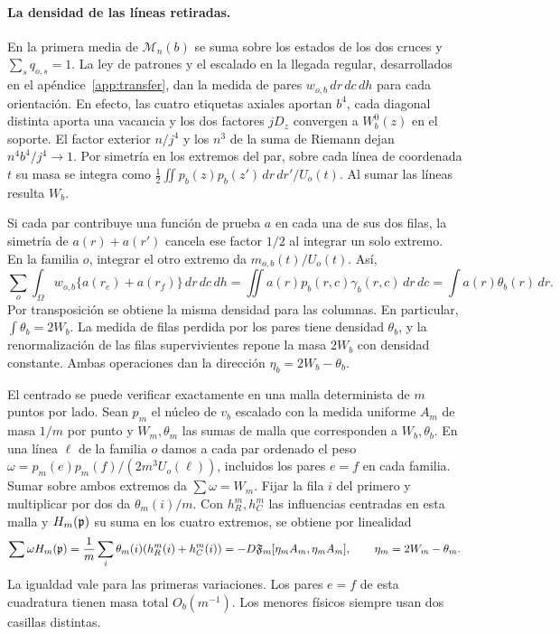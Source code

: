 \paragraph{La densidad de las líneas retiradas.}
En la primera media de \(\mathcal M_n(b)\) se suma sobre los estados de los dos cruces y
\(\sum_s q_{o,s}=1\). La ley de patrones y el escalado en la llegada regular, desarrollados
en el apéndice~\ref{app:transfer}, dan la medida de pares
\(w_{o,b}\,dr\,dc\,dh\) para cada orientación. En efecto, las cuatro etiquetas axiales
aportan \(b^4\), cada diagonal distinta aporta una vacancia y los dos factores \(jD_z\)
convergen a \(W_b^0(z)\) en el soporte. El factor exterior \(n/j^4\) y los \(n^3\) de la
suma de Riemann dejan \(n^4 b^4/j^4\to1\). Por simetría en los extremos del par, sobre
cada línea de coordenada \(t\) su masa se integra como
\(\frac12\iint p_b(z)p_b(z')\,dr\,dr'/U_o(t)\). Al sumar las líneas resulta \(W_b\).

Si cada par contribuye una función de prueba \(a\) en cada una de sus dos filas,
la simetría de \(a(r)+a(r')\) cancela ese factor \(1/2\) al integrar un solo extremo.
En la familia \(o\), integrar el otro extremo da \(m_{o,b}(t)/U_o(t)\). Así,
\[
 \sum_o\int_\Omega w_{o,b}\{a(r_e)+a(r_f)\}\,dr\,dc\,dh
 =\iint a(r)p_b(r,c)\gamma_b(r,c)\,dr\,dc
 =\int a(r)\theta_b(r)\,dr .
\]
Por transposición se obtiene la misma densidad para las columnas. En particular,
\(\int\theta_b=2W_b\). La medida de filas perdida por los pares tiene densidad
\(\theta_b\), y la renormalización de las filas supervivientes repone la masa \(2W_b\)
con densidad constante. Ambas operaciones dan la dirección \(\eta_b=2W_b-\theta_b\).

El centrado se puede verificar exactamente en una malla determinista de \(m\) puntos por
lado. Sean \(p_m\) el núcleo de \(v_b\) escalado con la medida uniforme \(A_m\) de masa
\(1/m\) por punto y \(W_m,\theta_m\) las sumas de malla que corresponden a \(W_b,\theta_b\).
En una línea \(\ell\) de la familia \(o\) damos a cada par ordenado el peso
\(\omega=p_m(e)p_m(f)/(2m^3 U_o(\ell))\), incluidos los pares \(e=f\) en cada familia.
Sumar sobre ambos extremos da \(\sum\omega=W_m\). Fijar la fila \(i\) del primero y
multiplicar por dos da \(\theta_m(i)/m\). Con \(h_R^m,h_C^m\) las influencias centradas
en esta malla y \(H_m(\mathfrak p)\) su suma en los cuatro extremos, se obtiene por linealidad
\[
 \sum\omega H_m(\mathfrak p)
 =\frac1m\sum_i\theta_m(i)(h_R^m(i)+h_C^m(i))
 =-D\mathfrak F_m[\eta_m A_m,\eta_m A_m],\qquad \eta_m=2W_m-\theta_m .
\]
La igualdad vale para las primeras variaciones. Los pares \(e=f\) de esta cuadratura
tienen masa total \(O_b(m^{-1})\). Los menores físicos siempre usan dos casillas distintas.


